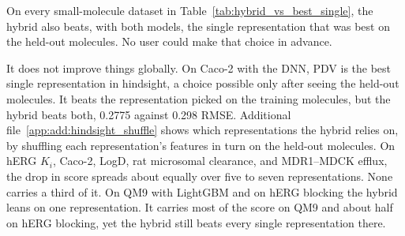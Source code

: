 On every small-molecule dataset in Table~\ref{tab:hybrid_vs_best_single}, the hybrid also beats, with both models, the single representation that was best on the held-out molecules. No user could make that choice in advance.

It does not improve things globally. On Caco-2 with the DNN, PDV is the best single representation in hindsight, a choice possible only after seeing the held-out molecules. It beats the representation picked on the training molecules, but the hybrid beats both, 0.2775 against 0.298 RMSE. Additional file~\ref{app:add:hindsight_shuffle} shows which representations the hybrid relies on, by shuffling each representation's features in turn on the held-out molecules. On hERG $K_i$, Caco-2, LogD, rat microsomal clearance, and MDR1--MDCK efflux, the drop in score spreads about equally over five to seven representations. None carries a third of it. On QM9 with LightGBM and on hERG blocking the hybrid leans on one representation. It carries most of the score on QM9 and about half on hERG blocking, yet the hybrid still beats every single representation there.


